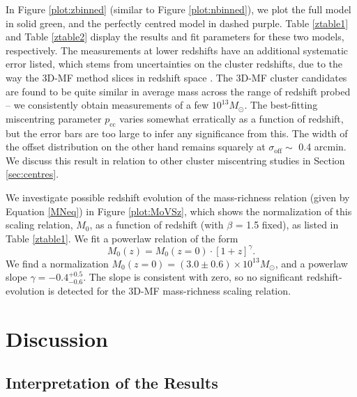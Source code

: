 In Figure \ref{plot:zbinned} (similar to Figure \ref{plot:nbinned}), we plot the full model in solid green, and the perfectly centred model in dashed purple. Table \ref{ztable1} and Table \ref{ztable2} display the results and fit parameters for these two models, respectively. The measurements at lower redshifts have an additional systematic error listed, which stems from uncertainties on the cluster redshifts, due to the way the \ac{3D-MF} method slices in redshift space \citep{Ford14}. The \ac{3D-MF} cluster candidates are found to be quite similar in average mass across the range of redshift probed -- we consistently obtain measurements of a few $10^{13} M_{\odot}$. The best-fitting miscentring parameter $p_{\mathrm{cc}}$ varies somewhat erratically as a function of redshift, but the error bars are too large to infer any significance from this. The width of the offset distribution on the other hand remains squarely at $\sigma_{\mathrm{off}} \sim$ 0.4 arcmin. We discuss this result in relation to other cluster miscentring studies in Section \ref{sec:centres}.

We investigate possible redshift evolution of the mass-richness relation (given by Equation \ref{MNeq}) in Figure \ref{plot:MoVSz}, which shows the normalization of this scaling relation, $M_0$, as a function of redshift (with $\beta$ = 1.5 fixed), as listed in Table \ref{ztable1}. We fit a powerlaw relation of the form
\begin{equation}
\label{MoZeq}
M_0 (z) = M_0 (z=0) \cdot \left[ 1+z \right] ^{\gamma}.
\end{equation}
We find a normalization $M_0 (z=0) = (3.0 \pm 0.6) \times 10^{13} M_{\odot}$, and a powerlaw slope $\gamma = -0.4^{+0.5}_{-0.6}$. The slope is consistent with zero, so no significant redshift-evolution is detected for the \ac{3D-MF} mass-richness scaling relation.



\section{Discussion}


\subsection{Interpretation of the Results}

